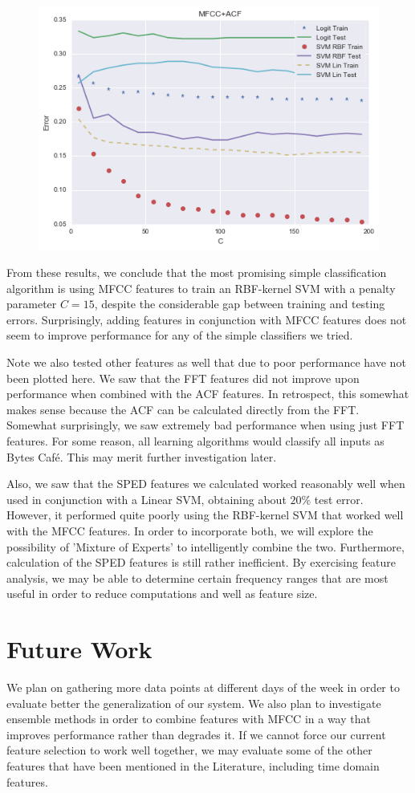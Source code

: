 \documentclass[journal]{IEEEtran}
\begin{document}
\begin{figure}[H]
\centering
\includegraphics[width=0.45\linewidth]{MFCC_ACF_Err}
\end{figure}
From these results, we conclude that the most promising simple classification algorithm is using MFCC features to train an RBF-kernel SVM with a penalty parameter $C=15$, despite the considerable gap between training and testing errors. Surprisingly, adding features in conjunction with MFCC features does not seem to improve performance for any of the simple classifiers we tried.

Note we also tested other features as well that due to poor performance have not been plotted here. We saw that the FFT features did not improve upon performance when combined with the ACF features. In retrospect, this somewhat makes sense because the ACF can be calculated directly from the FFT. Somewhat surprisingly, we saw extremely bad performance when using just FFT features. For some reason, all learning algorithms would classify all inputs as Bytes Caf\'e. This may merit further investigation later.

Also, we saw that the SPED features we calculated worked reasonably well when used in conjunction with a Linear SVM, obtaining about $20\%$ test error. However, it performed quite poorly using the RBF-kernel SVM that worked well with the MFCC features. In order to incorporate both, we will explore the possibility of 'Mixture of Experts' to intelligently combine the two. Furthermore, calculation of the SPED features is still rather inefficient. By exercising feature analysis, we may be able to determine certain frequency ranges that are most useful in order to reduce computations and well as feature size. 

\section{Future Work}
We plan on gathering more data points at different days of the week in order to evaluate better the generalization of our system. We also plan to investigate ensemble methods in order to combine features with MFCC in a way that improves performance rather than degrades it. If we cannot force our current feature selection to work well together, we may evaluate some of the other features that have been mentioned in the Literature, including time domain features.
\end{document}

